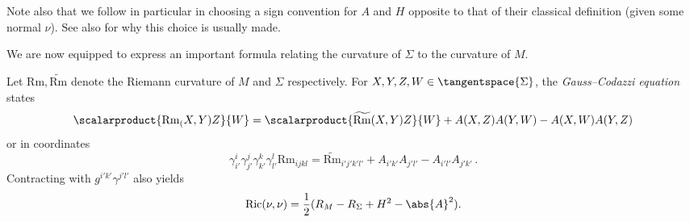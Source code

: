 \documentclass[titlepage,numbers=noenddot,oneside,%
cleardoublepage=empty,paper=a4,fontsize=11pt,%
english,%
]{scrartcl}
\newcommand*{\mathfullstop}{\,.}
\newcommand{\Ricci}{\mathrm{Ric}} %
\newcommand{\riemanncurvature}{\mathrm{Rm}} %
\begin{document}
{\begin{remark}
    Note also that we follow in particular \textcite{almarazPositiveMassTheorem2016} in choosing a sign convention for \( A \) and \( H \) opposite to that of their classical definition (given some normal \( \nu \)). See also \cite[Remark 2.1]{leeGeometricRelativity2019} for why this choice is usually made.
\end{remark}
We are now equipped to express an important formula relating the curvature of \( \Sigma \) to the curvature of \( M \). 
\begin{lemma}
    Let \( \riemanncurvature,\widetilde{\riemanncurvature} \) denote the Riemann curvature of \( M \) and \( \Sigma \) respectively.
    For \( X,Y,Z,W \in \tangentspace{\Sigma}\), the \emph{Gauss--Codazzi equation} states
    \begin{equation}
        \scalarproduct{\riemanncurvature_(X,Y)Z}{W}=\scalarproduct{\widetilde{\riemanncurvature}(X,Y)Z}{W}+A(X,Z)A(Y,W)-A(X,W)A(Y,Z)\label{eq:gauss_codazzi}
    \end{equation}
    or in coordinates
    \begin{equation}
        \gamma^{i}_{i'}\gamma^j_{j'}\gamma^k_{k'}\gamma^l_{l'}\riemanncurvature_{ijkl}=\widetilde{\riemanncurvature}_{i'j'k'l'}+A_{i'k'}A_{j'l'}-A_{i'l'}A_{j'k'}\label{eq:gauss_codazzi_coordinates}\mathfullstop
    \end{equation}
    Contracting with \( g^{i'k'}\gamma^{j'l'} \) also yields
    \begin{equation}
        \Ricci(\nu,\nu)=\frac{1}{2}(R_M-R_{\Sigma}+H^2-\abs{A}^2). \label{eq:contracted_gauss_codazzi}
    \end{equation}
\end{lemma}

}
\end{document}
